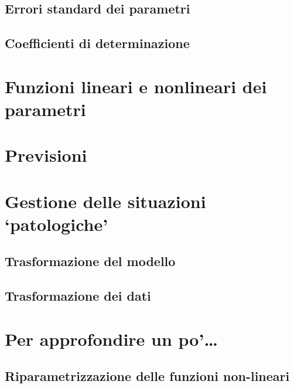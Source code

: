 \documentclass[a4paper,12pt,oneside]{book}
\begin{document}
\hypertarget{errori-standard-dei-parametri-1}{%
\subsection{Errori standard dei parametri}\label{errori-standard-dei-parametri-1}}

\hypertarget{coefficienti-di-determinazione}{%
\subsection{Coefficienti di determinazione}\label{coefficienti-di-determinazione}}

\hypertarget{funzioni-lineari-e-nonlineari-dei-parametri}{%
\section{Funzioni lineari e nonlineari dei parametri}\label{funzioni-lineari-e-nonlineari-dei-parametri}}

\hypertarget{previsioni-1}{%
\section{Previsioni}\label{previsioni-1}}

\hypertarget{gestione-delle-situazioni-patologiche}{%
\section{Gestione delle situazioni `patologiche'}\label{gestione-delle-situazioni-patologiche}}

\hypertarget{trasformazione-del-modello}{%
\subsection{Trasformazione del modello}\label{trasformazione-del-modello}}

\hypertarget{trasformazione-dei-dati}{%
\subsection{Trasformazione dei dati}\label{trasformazione-dei-dati}}

\hypertarget{per-approfondire-un-po-1}{%
\section{Per approfondire un po'\ldots{}}\label{per-approfondire-un-po-1}}

\hypertarget{riparametrizzazione-delle-funzioni-non-lineari}{%
\subsection{Riparametrizzazione delle funzioni non-lineari}\label{riparametrizzazione-delle-funzioni-non-lineari}}
\end{document}
